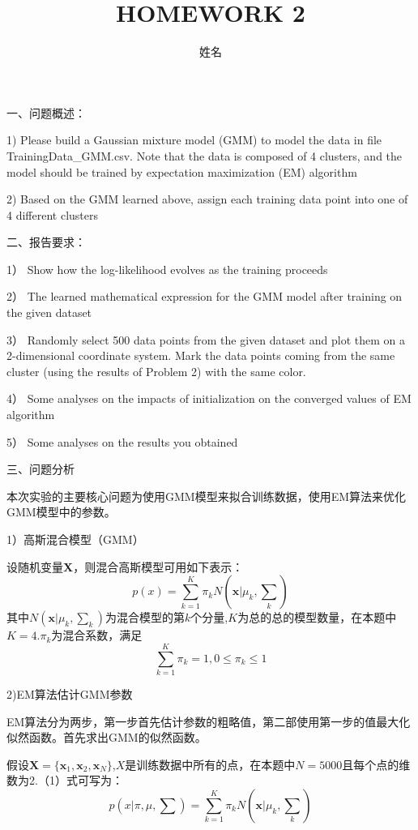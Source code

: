 \documentclass[bachelor]{ctexart}
\title{HOMEWORK 2}
\author{姓名}
\begin{document}
\maketitle
一、问题概述：

1) Please build a Gaussian mixture model (GMM) to model the data in file {TrainingData\_GMM.csv}. Note that the data is composed of 4 clusters, and the model should be trained by expectation maximization (EM) algorithm

2) Based on the GMM learned above, assign each training data point into one of 4 different clusters

二、报告要求：

1） Show how the log-likelihood evolves as the training proceeds

2） The learned mathematical expression for the GMM model after training on the given dataset

3） Randomly select 500 data points from the given dataset and plot them on a 2-dimensional coordinate system. Mark the data points coming from the same cluster (using the results of Problem 2) with the same color.

4） Some analyses on the impacts of initialization on the converged values of EM algorithm

5） Some analyses on the results you obtained

三、问题分析

本次实验的主要核心问题为使用GMM模型来拟合训练数据，使用EM算法来优化GMM模型中的参数。

1）高斯混合模型（GMM）

设随机变量\textbf{X}，则混合高斯模型可用如下表示：
\begin{equation}
p(x) = \sum_{k=1}^{K}\pi_k N(\textbf{x}|\mu_k, {\sum}_k)
\end{equation}
其中$N(\textbf{x}|\mu_k, {\sum}_k)$为混合模型的第$k$个分量,$K$为总的总的模型数量，在本题中$K=4$.$\pi_k$为混合系数，满足
\begin{equation}
\sum_{k=1}^{K}\pi_k = 1, 0 \leq \pi_k \leq 1
\end{equation}

2)EM算法估计GMM参数

EM算法分为两步，第一步首先估计参数的粗略值，第二部使用第一步的值最大化似然函数。首先求出GMM的似然函数。

假设$\textbf{X} = \{\textbf{x}_1, \textbf{x}_2, \textbf{x}_N\}$,$X$是训练数据中所有的点，在本题中$N=5000$且每个点的维数为2.（1）式可写为：
\begin{equation}
p(x|\pi, \mu, \sum) = \sum_{k=1}^{K}\pi_k N(\textbf{x}|\mu_k, {\sum}_k)
\end{equation}
\end{document}
